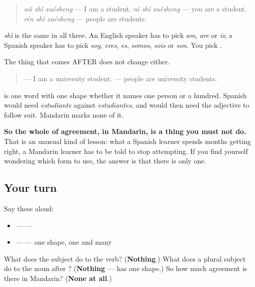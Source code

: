 \begin{quote}
\textbf{} \emph{wǒ shì xuésheng} — I am a student. \textbf{} \emph{nǐ shì xuésheng} — you are a student. \textbf{} \emph{rén shì xuésheng} — people are students.
\end{quote}

 \emph{shì} is the same  in all three. An English speaker has to pick \emph{am}, \emph{are} or \emph{is}; a Spanish speaker has to pick \emph{soy}, \emph{eres}, \emph{es}, \emph{somos}, \emph{sois} or \emph{son}. You pick .

\begin{grammarlens}[title={Grammar Lens: and nothing after the verb agrees either}]
The thing that comes AFTER  does not change either.

\begin{quote}
\textbf{} — I am a university student. \textbf{} — people are university students.
\end{quote}

 is one word with one shape whether it names one person or a hundred. Spanish would need \emph{estudiante} against \emph{estudiantes}, and would then need the adjective to follow suit. Mandarin marks none of it.

\textbf{So the whole of agreement, in Mandarin, is a thing you must not do.} That is an unusual kind of lesson: what a Spanish learner spends months getting right, a Mandarin learner has to be told to stop attempting. If you find yourself wondering which form to use, the answer is that there is only one.
\end{grammarlens}

\subsection*{Your turn}
Say these aloud:

\begin{itemize}
\raggedright
  \item {} —  — 
  \item {} —  — one shape, one and many
\end{itemize}

\begin{tcolorbox}[breakable,colback=teal!4,colframe=teal!35!black,title={Before you move on}]
What does the subject do to the verb? (\textbf{Nothing}.) What does a plural subject do to the noun after ? (\textbf{Nothing} —  has one shape.) So how much agreement is there in Mandarin? (\textbf{None at all}.)
\end{tcolorbox}
